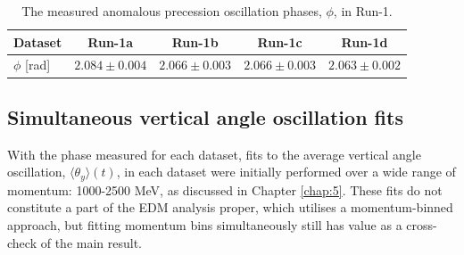 \begin{table}[h!]
\centering{}
\begin{tabular}{l|cccc}
\hline
\hline
Dataset & Run-1a & Run-1b & Run-1c & Run-1d \\
\hline
$\phi$ [rad] & $2.084\pm0.004$ & $2.066\pm0.003$ & $2.066\pm0.003$ & $2.063\pm0.002$ \\ 
\hline
\hline
\end{tabular}
\caption{The measured anomalous precession oscillation phases, $\phi$, in Run-1.} 
\label{tbl:Run1Phases}
\end{table}

\subsection{Simultaneous vertical angle oscillation fits}

With the phase measured for each dataset, fits to the average vertical angle oscillation, $\langle \theta_{y} \rangle (t)$, in each dataset were initially performed over a wide range of momentum: 1000-2500 MeV, as discussed in Chapter \ref{chap:5}. These fits do not constitute a part of the EDM analysis proper, which utilises a momentum-binned approach, but fitting momentum bins simultaneously still has value as a cross-check of the main result. 

